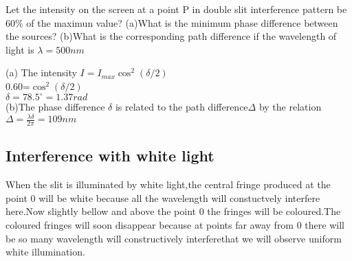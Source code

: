 \begin{exercise}
	Let the intensity on the screen at a point  P in double slit interference pattern be $60\%$ of the maximun value?
	(a)What is the minimum phase difference between the sources?
	(b)What is the corresponding path difference if the wavelength of light is $\lambda=500nm$
\end{exercise}
\begin{answer}
(a)	The intensity $I=I_{max}\cos^2\left( \delta/2\right) $\\
 0.60=$\cos^2\left( \delta/2\right) $\\
 $\delta=78.5^{\circ}=1.37rad$\\
 (b)The phase difference $\delta$ is related to the path difference$\Delta$ by the relation\\
 $\Delta=\frac{\lambda \delta}{2\pi}=109nm$
\end{answer}
\subsection{Interference with white light}
When the slit is illuminated by white light,the central fringe produced at the point 0 will be white because all the wavelength will constuctvely interfere here.Now slightly bellow and above the point 0 the fringes will be coloured.The coloured fringes will soon disappear because at points far away from 0 there will be so many wavelength will constructively interferethat we will observe uniform white illumination.
